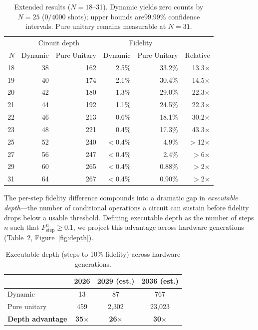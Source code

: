\documentclass[11pt]{article}
\begin{document}
\begin{table}[h]
\centering
\caption{Extended results ($N=18$--31). Dynamic yields zero counts by $N=25$ (0/4000 shots); upper bounds are99.99\% confidence intervals. Pure unitary remains measurable at $N=31$.}
\label{tab:extend}
\begin{tabular}{@{}rrrrrr@{}}
\toprule
 & \multicolumn{2}{c}{Circuit depth} & \multicolumn{2}{c}{Fidelity} & \\
$N$ & Dynamic & Pure Unitary & Dynamic & Pure Unitary & Relative \\
\midrule
18 & 38 & 162 & 2.5\% & 33.2\% & 13.3$\times$ \\
19 & 40 & 174 & 2.1\% & 30.4\% & 14.5$\times$ \\
20 & 42 & 180 & 1.3\% & 29.0\% & 22.3$\times$ \\
21 & 44 & 192 & 1.1\% & 24.5\% & 22.3$\times$ \\
22 & 46 & 213 & 0.6\% & 18.1\% & 30.2$\times$ \\
23 & 48 & 221 & 0.4\% & 17.3\% & 43.3$\times$ \\
25 & 52 & 240 & $<$0.4\% & 4.9\% & $>$12$\times$ \\
27 & 56 & 247 & $<$0.4\% & 2.4\% & $>$6$\times$ \\
29 & 60 & 265 & $<$0.4\% & 0.88\% & $>$2$\times$ \\
31 & 64 & 267 & $<$0.4\% & 0.90\% & $>$2$\times$ \\
\bottomrule
\end{tabular}
\end{table}

The per-step fidelity difference compounds into a dramatic gap in \emph{executable depth}---the number of conditional operations a circuit can sustain before fidelity drops below a usable threshold.
Defining executable depth as the number of steps $n$ such that $F_\text{step}^n \geq 0.1$, we project this advantage across hardware generations (Table~\ref{tab:depth}, Figure~\ref{fig:depth}).
\begin{table}[h]
\centering
\caption{Executable depth (steps to 10\% fidelity) across hardware generations.}
\label{tab:depth}
\begin{tabular}{lccc}
\hline
 & \textbf{2026} & \textbf{2029 (est.)} & \textbf{2036 (est.)} \\
\hline
Dynamic & 13 & 87 & 767 \\
Pure unitary & 459 & 2{,}302 & 23{,}023 \\
\textbf{Depth advantage} & \textbf{35}$\times$ & \textbf{26}$\times$ & \textbf{30}$\times$ \\
\hline
\end{tabular}
\end{table}
\end{document}
